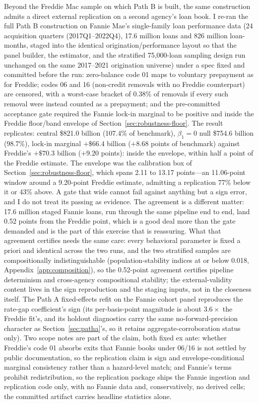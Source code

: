 \documentclass[12pt]{article}
\begin{document}
Beyond the Freddie Mac sample on which Path B is built, the same construction admits a direct external replication on a second agency's loan book. I re-ran the full Path B construction on Fannie Mae's single-family loan performance data (24 acquisition quarters (2017Q1--2022Q4), 17.6 million loans and 826 million loan-months, staged into the identical origination/performance layout so that the panel builder, the estimator, and the stratified 75{,}000-loan sampling design run unchanged on the same 2017--2021 origination universe) under a spec fixed and committed before the run: zero-balance code 01 maps to voluntary prepayment as for Freddie; codes 06 and 16 (non-credit removals with no Freddie counterpart) are censored, with a worst-case bracket of 0.38\% of removals if every such removal were instead counted as a prepayment; and the pre-committed acceptance gate required the Fannie lock-in marginal to be positive and inside the Freddie floor/band envelope of Section~\ref{sec:robustness-floor}. The result replicates: central \$821.0 billion (107.4\% of benchmark), $\beta_1 = 0$ null \$754.6 billion (98.7\%), lock-in marginal $+\$66.4$ billion ($+8.68$ points of benchmark) against Freddie's $+\$70.3$ billion ($+9.20$ points): inside the envelope, within half a point of the Freddie estimate. The envelope was the calibration box of Section~\ref{sec:robustness-floor}, which spans 2.11 to 13.17 points---an 11.06-point window around a 9.20-point Freddie estimate, admitting a replication 77\% below it or 43\% above. A gate that wide cannot fail against anything but a sign error, and I do not treat its passing as evidence. The agreement is a different matter: 17.6 million staged Fannie loans, run through the same pipeline end to end, land 0.52 points from the Freddie point, which is a good deal more than the gate demanded and is the part of this exercise that is reassuring. What that agreement certifies needs the same care: every behavioral parameter is fixed a priori and identical across the two runs, and the two stratified samples are compositionally indistinguishable (population-stability indices at or below 0.018, Appendix~\ref{app:composition}), so the 0.52-point agreement certifies pipeline determinism and cross-agency compositional stability; the external-validity content lives in the sign reproduction and the staging inputs, not in the closeness itself. The Path A fixed-effects refit on the Fannie cohort panel reproduces the rate-gap coefficient's sign (its per-basis-point magnitude is about $3.6\times$ the Freddie fit's, and its holdout diagnostics carry the same no-forward-precision character as Section~\ref{sec:patha}'s, so it retains aggregate-corroboration status only). Two scope notes are part of the claim, both fixed ex ante: whether Freddie's code 01 absorbs exits that Fannie books under 06/16 is not settled by public documentation, so the replication claim is sign and envelope-conditional marginal consistency rather than a hazard-level match; and Fannie's terms prohibit redistribution, so the replication package ships the Fannie ingestion and replication code only, with no Fannie data and, conservatively, no derived cells; the committed artifact carries headline statistics alone.
\end{document}
